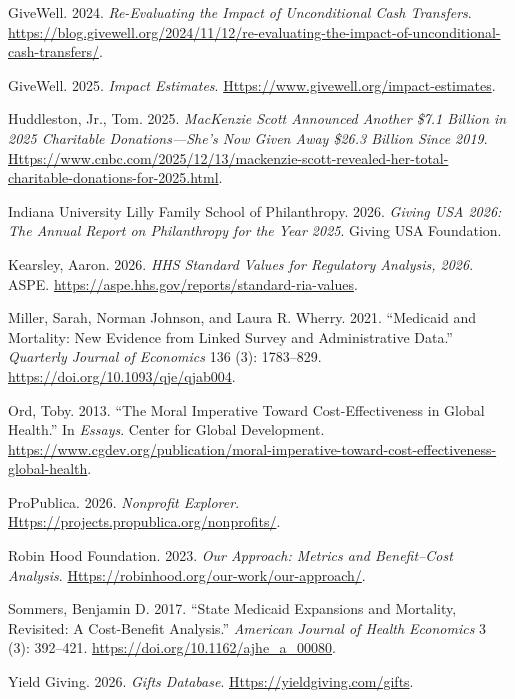 \documentclass[
  11pt,
  letterpaper,
  DIV=11,
  numbers=noendperiod]{scrartcl}
\newlength{\cslhangindent}
\newenvironment{CSLReferences}[2] %
 {\begin{list}{}{%
  \setlength{\itemindent}{0pt}
  \setlength{\leftmargin}{0pt}
  \setlength{\parsep}{0pt}
  \ifodd #1
   \setlength{\leftmargin}{\cslhangindent}
   \setlength{\itemindent}{-1\cslhangindent}
  \fi
  \setlength{\itemsep}{#2\baselineskip}}}
 {\end{list}}
\begin{document}
\begin{CSLReferences}{1}{1}
GiveWell. 2024. \emph{Re-Evaluating the Impact of Unconditional Cash
Transfers}.
\url{https://blog.givewell.org/2024/11/12/re-evaluating-the-impact-of-unconditional-cash-transfers/}.

GiveWell. 2025. \emph{Impact Estimates}.
\href{https://www.givewell.org/impact-estimates}{Https://www.givewell.org/impact-estimates}.

Huddleston, Jr., Tom. 2025. \emph{{M}ac{K}enzie {S}cott Announced
Another \$7.1 Billion in 2025 Charitable Donations---She's Now Given
Away \$26.3 Billion Since 2019}.
\href{https://www.cnbc.com/2025/12/13/mackenzie-scott-revealed-her-total-charitable-donations-for-2025.html}{Https://www.cnbc.com/2025/12/13/mackenzie-scott-revealed-her-total-charitable-donations-for-2025.html}.

Indiana University Lilly Family School of Philanthropy. 2026.
\emph{Giving {USA} 2026: The Annual Report on Philanthropy for the Year
2025}. Giving USA Foundation.

Kearsley, Aaron. 2026. \emph{{HHS} Standard Values for Regulatory
Analysis, 2026}. ASPE.
\url{https://aspe.hhs.gov/reports/standard-ria-values}.

Miller, Sarah, Norman Johnson, and Laura R. Wherry. 2021. {``Medicaid
and Mortality: New Evidence from Linked Survey and Administrative
Data.''} \emph{Quarterly Journal of Economics} 136 (3): 1783--829.
\url{https://doi.org/10.1093/qje/qjab004}.

Ord, Toby. 2013. {``The Moral Imperative Toward Cost-Effectiveness in
Global Health.''} In \emph{Essays}. Center for Global Development.
\url{https://www.cgdev.org/publication/moral-imperative-toward-cost-effectiveness-global-health}.

ProPublica. 2026. \emph{Nonprofit Explorer}.
\href{https://projects.propublica.org/nonprofits/}{Https://projects.propublica.org/nonprofits/}.

Robin Hood Foundation. 2023. \emph{Our Approach: Metrics and
Benefit--Cost Analysis}.
\href{https://robinhood.org/our-work/our-approach/}{Https://robinhood.org/our-work/our-approach/}.

Sommers, Benjamin D. 2017. {``State {M}edicaid Expansions and Mortality,
Revisited: A Cost-Benefit Analysis.''} \emph{American Journal of Health
Economics} 3 (3): 392--421. \url{https://doi.org/10.1162/ajhe_a_00080}.

Yield Giving. 2026. \emph{Gifts Database}.
\href{https://yieldgiving.com/gifts}{Https://yieldgiving.com/gifts}.

\end{CSLReferences}
\end{document}
